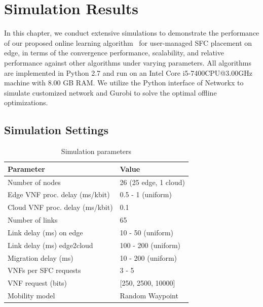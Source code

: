 \chapter{\textbf{Simulation Results}}
\label{chapter:simulation}
In this chapter, we conduct extensive simulations to demonstrate the performance of our proposed online learning algorithm \myalgorithm\ for user-managed SFC placement on edge, in terms of the convergence performance, scalability, and relative performance against other algorithms under varying parameters. All algorithms are implemented in Python 2.7 and run on an Intel Core i5-7400CPU@3.00GHz machine with 8.00 GB RAM. We utilize the Python interface of Networkx \cite{networkx} to simulate customized network and Gurobi \cite{gurobi} to solve the optimal offline optimizations.


\section{Simulation Settings}
\begin{table}
	\centering
	\caption{Simulation parameters}
		\vspace{\baselineskip}
	\label{tab:Simulation parameters}
	\begin{tabular}{ll}
		\toprule
		Parameter & Value \\[5pt]
		\midrule
		Number of nodes & 26 (25 edge, 1 cloud)\\[5pt]
		
		Edge VNF proc. delay (ms/kbit) & 0.5 - 1 (uniform)\\[5pt]
		Cloud VNF proc. delay (ms/kbit) & 0.1\\[5pt]
		Number of links & 65\\[5pt]
		Link delay (ms) on edge & 10 - 50 (uniform) \\[5pt]
		Link delay (ms) edge2cloud & 100 - 200 (uniform) \\[5pt]
		Migration delay (ms)& 10 - 200 (uniform)\\[5pt]
		VNFs per SFC requests &  3 - 5\\[5pt]
		VNF request (bits) & [250, 2500, 10000]\\[5pt]
		Mobility model & Random Waypoint \\ [5pt]
		
		\bottomrule
	\end{tabular}
\end{table}

